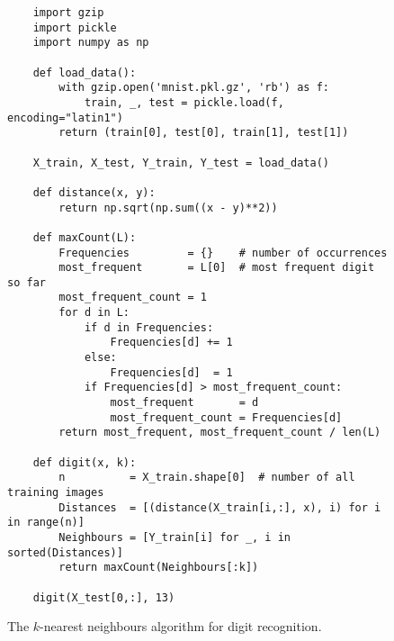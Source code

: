 \begin{figure}[!ht]
\centering
\begin{verbatim}
    import gzip
    import pickle
    import numpy as np

    def load_data():
        with gzip.open('mnist.pkl.gz', 'rb') as f:
            train, _, test = pickle.load(f, encoding="latin1")
        return (train[0], test[0], train[1], test[1])
        
    X_train, X_test, Y_train, Y_test = load_data()
        
    def distance(x, y):
        return np.sqrt(np.sum((x - y)**2))
    
    def maxCount(L):
        Frequencies         = {}    # number of occurrences 
        most_frequent       = L[0]  # most frequent digit so far
        most_frequent_count = 1     
        for d in L:
            if d in Frequencies:
                Frequencies[d] += 1
            else:
                Frequencies[d]  = 1
            if Frequencies[d] > most_frequent_count:
                most_frequent       = d
                most_frequent_count = Frequencies[d]
        return most_frequent, most_frequent_count / len(L)
    
    def digit(x, k):
        n          = X_train.shape[0]  # number of all training images
        Distances  = [(distance(X_train[i,:], x), i) for i in range(n)]
        Neighbours = [Y_train[i] for _, i in sorted(Distances)]
        return maxCount(Neighbours[:k])

    digit(X_test[0,:], 13)
\end{verbatim}
\vspace*{-0.3cm}
\caption{The $k$-nearest neighbours algorithm for digit recognition.}
\label{fig:Digit-Recognition.ipynb}
\end{figure}


